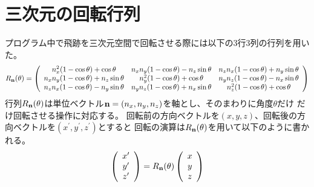 \documentclass [11pt,a4paper,dvipdfmx] {jarticle}
\begin{document}
\section{三次元の回転行列}
プログラム中で飛跡を三次元空間で回転させる際には以下の3行3列の行列を用いた。
\begin{eqnarray}
    R_{\bold{n}}(\theta)
    = \left(
        \begin{array}{ccc}
            n_{x}^{2}(1-\cos\theta)+\cos \theta & n_{x}n_{y}(1-\cos\theta)-n_{z}\sin\theta &  n_{z}n_{x}(1-\cos\theta)+n_{y}\sin\theta  \\
            n_{x}n_{y}(1-\cos\theta)+n_{z}\sin\theta & n_{y}^2(1-\cos\theta)+\cos\theta &  n_{y}n_{z}(1-\cos\theta)-n_{x}\sin\theta  \\
            n_{z}n_{x}(1-\cos\theta)-n_{y}\sin\theta & n_{y}n_{z}(1-\cos\theta)+n_{x}\sin\theta &  n_{z}^2(1-\cos\theta)+\cos\theta
        \end{array}
    \right)
    \end{eqnarray}
行列$R_{\bold{n}}(\theta)$は単位ベクトル$\bold{n} = (n_{x}, n_{y}, n_{z})$を軸とし、そのまわりに角度$\theta$だけ
だけ回転させる操作に対応する。
回転前の方向ベクトルを$(x, y, z)$、回転後の方向ベクトルを$(x^{\prime}, y^{\prime}, z^{\prime})$とすると
回転の演算は$R_{\bold{n}}(\theta)$を用いて以下のように書かれる。
    \begin{eqnarray}
        \left(
            \begin{array}{c}
                x^{\prime} \\
                y^{\prime} \\
                z^{\prime}
            \end{array}
        \right)
        = R_{\bold{n}}(\theta)
        \left(
            \begin{array}{c}
                x \\
                y \\
                z
            \end{array}
        \right)
    \end{eqnarray}
\end{document}
